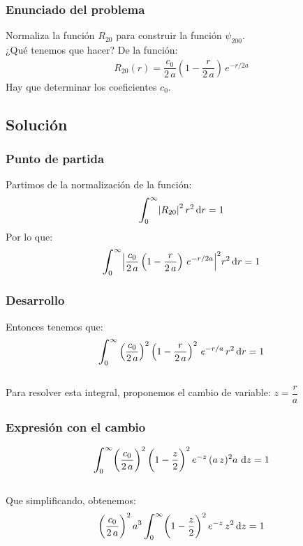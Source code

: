 \documentclass[12pt]{beamer}
\begin{document}
\begin{frame}
\frametitle{Enunciado del problema}
Normaliza la función $R_{20}$ para construir la función $\psi_{200}$.
\\
\bigskip
\pause
¿Qué tenemos que hacer? \pause
De la función:
\begin{align*}
R_{20}(r) = \dfrac{c_{0}}{2 \, a} \left( 1 - \dfrac{r}{2 \, a} \right) \, e^{-r/2a}
\end{align*}
Hay que determinar los coeficientes $c_{0}$.
\end{frame}

\subsection{Solución}

\begin{frame}
\frametitle{Punto de partida}
Partimos de la normalización de la función:
\begin{align*}
\scaleint{6ex}_{\bs 0}^{\infty} \abs{R_{20}}^{2} \, r^{2} \dd{r} = 1
\end{align*}
\pause
Por lo que:
\begin{align*}
\scaleint{6ex}_{\bs 0}^{\infty} \abs{ \dfrac{c_{0}}{2 \, a} \left( 1 - \dfrac{r}{2 \, a} \right) \, e^{-r/2a} }^{2} r^{2} \dd{r} = 1
\end{align*}
\end{frame}
\begin{frame}
\frametitle{Desarrollo}
Entonces tenemos que:
\begin{align*}
\scaleint{6ex}_{\bs 0}^{\infty} \left(\dfrac{c_{0}}{2 \, a}\right)^{2} \left( 1 - \dfrac{r}{2 \, a} \right)^{2} \, e^{-r/a} \, r^{2} \dd{r} = 1
\end{align*}
\\
\bigskip
\pause
Para resolver esta integral, \pause proponemos el cambio de variable: $z = \dfrac{r}{a}$
\end{frame}
\begin{frame}
\frametitle{Expresión con el cambio}
\begin{align*}
\scaleint{6ex}_{\bs 0}^{\infty} \bigg( \dfrac{c_{0}}{2 \, a} \bigg)^{2} \, \bigg( 1 - \dfrac{z}{2} \bigg)^{2} \, e^{-z} \, (a \, z)^{2} a \, \dd{z} = 1
\end{align*}
\\
\bigskip
\pause
Que simplificando, obtenemos:
\pause
\begin{align*}
\bigg( \dfrac{c_{0}}{2 \, a} \bigg)^{2} \, a^{3} \, \scaleint{6ex}_{\bs 0}^{\infty} \bigg( 1 - \dfrac{z}{2} \bigg)^{2} \, e^{-z} \, z^{2} \dd{z} = 1
\end{align*}
\end{frame}
\end{document}
